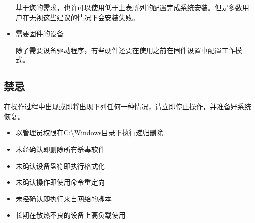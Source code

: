 \documentclass{article}
\begin{document}
\begin{multicols*}{3}
\begin{itemize}[leftmargin=*]
		基于您的需求，也许可以使用低于上表所列的配置完成系统安装。但是多数用户在无视这些建议的情况下会安装失败。

		\item 需要固件的设备

		除了需要设备驱动程序，有些硬件还要在使用之前在固件设置中配置工作模式。

	\end{itemize}


	\begin{tcolorbox}
	\section*{禁忌}
	\end{tcolorbox}

	在操作过程中出现或即将出现下列任何一种情况，请立即停止操作，并准备好系统恢复。

	\begin{itemize}[leftmargin=*]
		\setlength{\itemsep}{0pt}
		\setlength{\parskip}{0pt}
		\setlength{\parsep}{0pt}

		\item 以管理员权限在C:{\textbackslash}Windows目录下执行递归删除
		\item 未经确认即删除所有杀毒软件
		\item 未确认设备盘符即执行格式化
		\item 未确认操作即使用命令重定向
		\item 未经确认即执行来自网络的脚本
		\item 长期在散热不良的设备上高负载使用
	\end{itemize}







\end{multicols*}
\end{document}
